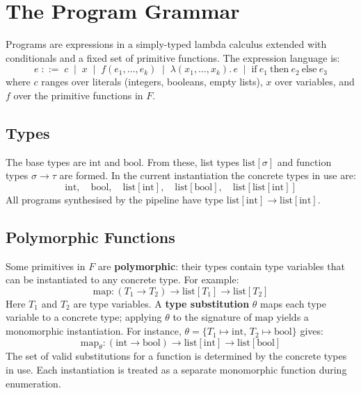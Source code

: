\documentclass[11pt,a4paper]{article}
\begin{document}
\section{The Program Grammar}\label{sec:grammar}

Programs are expressions in a simply-typed lambda calculus extended with conditionals and
a fixed set of primitive functions. The expression language is:
\[
  e \;::=\; c \;\mid\; x \;\mid\; f(e_1, \ldots, e_k)
         \;\mid\; \lambda(x_1, \ldots, x_k).\, e
         \;\mid\; \mathrm{if}\ e_1\ \mathrm{then}\ e_2\ \mathrm{else}\ e_3
\]
where $c$ ranges over literals (integers, booleans, empty lists), $x$ over variables, and
$f$ over the primitive functions in $F$.

\subsection{Types}\label{sec:types}

The base types are $\mathrm{int}$ and $\mathrm{bool}$. From these, list types
$\mathrm{list}[\sigma]$ and function types $\sigma \to \tau$ are formed. In the current
instantiation the concrete types in use are:
\[
  \mathrm{int},\quad \mathrm{bool},\quad \mathrm{list}[\mathrm{int}],\quad
  \mathrm{list}[\mathrm{bool}],\quad \mathrm{list}[\mathrm{list}[\mathrm{int}]]
\]
All programs synthesised by the pipeline have type
$\mathrm{list}[\mathrm{int}] \to \mathrm{list}[\mathrm{int}]$.

\subsection{Polymorphic Functions}\label{sec:polymorphic}

Some primitives in $F$ are \textbf{polymorphic}: their types contain type variables that
can be instantiated to any concrete type. For example:
\[
  \mathrm{map} : (T_1 \to T_2) \to \mathrm{list}[T_1] \to \mathrm{list}[T_2]
\]
Here $T_1$ and $T_2$ are type variables. A \textbf{type substitution} $\theta$ maps each
type variable to a concrete type; applying $\theta$ to the signature of $\mathrm{map}$
yields a monomorphic instantiation. For instance,
$\theta = \{T_1 \mapsto \mathrm{int},\, T_2 \mapsto \mathrm{bool}\}$ gives:
\[
  \mathrm{map}_\theta : (\mathrm{int} \to \mathrm{bool})
    \to \mathrm{list}[\mathrm{int}] \to \mathrm{list}[\mathrm{bool}]
\]
The set of valid substitutions for a function is determined by the concrete types in use.
Each instantiation is treated as a separate monomorphic function during enumeration.
\end{document}
